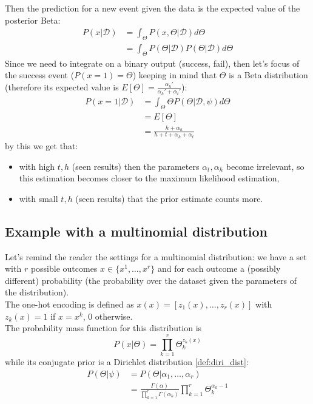             Then the prediction for a new event given the data is the expected value of the posterior Beta:
            \begin{align*}
                P(x|\mathcal{D})    &= \int_\Theta P(x,\Theta|\mathcal{D})d\Theta\\
                                    &= \int_\Theta P(\Theta|\mathcal{D}) P(\Theta|\mathcal{D})d\Theta
            \end{align*}
            Since we need to integrate on a binary output (success, fail), then let's focus of the success event ($P(x=1) =\Theta$) keeping in mind that $\Theta$ is a Beta distribution (therefore its expected value is $E[\Theta] = \frac{\alpha_h '}{\alpha_h ' + \alpha_t '}$):
            \begin{align*}
                P(x = 1 | \mathcal{D}) & = \int_\Theta \Theta P(\Theta|\mathcal{D}, \psi) d\Theta\\
                &= E[\Theta]\\
                &= \frac{h + \alpha_h}{h + t + \alpha_h + \alpha_t}
            \end{align*}
            by this we get that: 
            \begin{itemize}
                \item with high $t, h$ (seen results) then the parameters $\alpha_t, \alpha_h$ become irrelevant, so this estimation becomes closer to the maximum likelihood estimation,
                \item with small $t, h$ (seen results) that the prior estimate counts more.
            \end{itemize}
    
    \subsection{Example with a multinomial distribution}
        Let's remind the reader the settings for a multinomial distribution: we have a set with $r$ possible outcomes $x \in \{x^1, \dots, x^r\}$ and for each outcome a (possibly different) probability (the probability over the dataset given the parameters of the distribution).\\
        The one-hot encoding is defined as $x(x) = [z_1(x), \dots, z_r(x)]$ with $z_k(x) = 1$ if $x = x^k$, 0 otherwise.\\
        The probability mass function for this distribution is
        $$P(x|\Theta) = \prod_{k=1}^r \Theta_k^{z_k(x)}$$
        while its conjugate prior is a Dirichlet distribution \ref{def:diri_dist}:
        \begin{align*}
            P(\Theta|\psi)  &= P(\Theta|\alpha_1, \dots, \alpha_r)\\
                            &= \frac{\Gamma(\alpha)}{\prod_{k=1}^r \Gamma (\alpha_k)} \prod_{k=1}^r \Theta_k^{\alpha_k -1}
        \end{align*}
        
